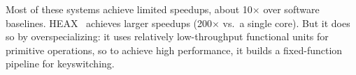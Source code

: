 Most of these systems achieve limited speedups, about 10$\times$ over software
baselines. HEAX~\cite{riazi:asplos20:heax} achieves larger speedups
(200$\times$ vs.\ a single core). But it does so by overspecializing: it uses
relatively low-throughput functional units for primitive operations, so to
achieve high performance, it builds a fixed-function pipeline for
keyswitching.
